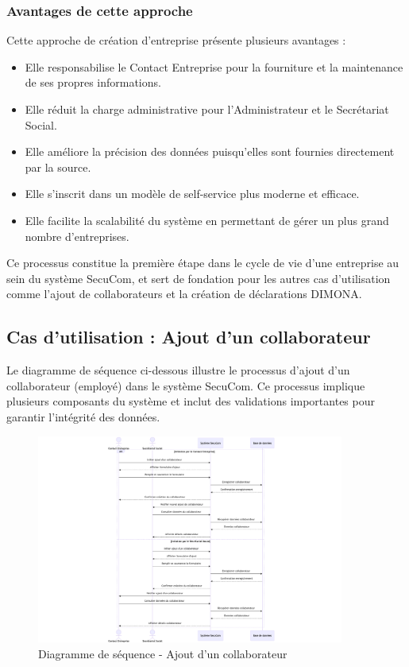 \documentclass[12pt,a4paper]{report}
\begin{document}
\subsubsection{Avantages de cette approche}

Cette approche de création d'entreprise présente plusieurs avantages :
\begin{itemize}
  \item Elle responsabilise le Contact Entreprise pour la fourniture et la maintenance de ses propres informations.
  \item Elle réduit la charge administrative pour l'Administrateur et le Secrétariat Social.
  \item Elle améliore la précision des données puisqu'elles sont fournies directement par la source.
  \item Elle s'inscrit dans un modèle de self-service plus moderne et efficace.
  \item Elle facilite la scalabilité du système en permettant de gérer un plus grand nombre d'entreprises.
\end{itemize}

Ce processus constitue la première étape dans le cycle de vie d'une entreprise au sein du système SecuCom, et sert de fondation pour les autres cas d'utilisation comme l'ajout de collaborateurs et la création de déclarations DIMONA.

\subsection{Cas d'utilisation : Ajout d'un collaborateur}

Le diagramme de séquence ci-dessous illustre le processus d'ajout d'un collaborateur (employé) dans le système SecuCom. Ce processus implique plusieurs composants du système et inclut des validations importantes pour garantir l'intégrité des données.

\begin{figure}[h]
\centering
\includegraphics[width=0.9\textwidth]{SD_creation_collaborateur.png}
\caption{Diagramme de séquence - Ajout d'un collaborateur}
\end{figure}
\end{document}
